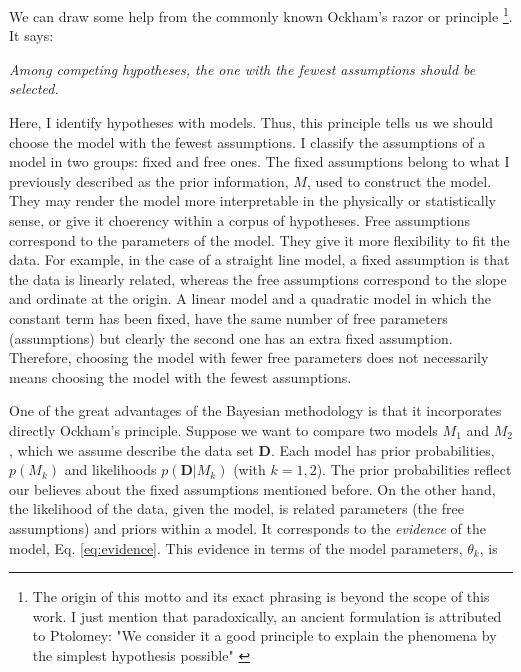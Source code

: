We can draw some help from the commonly known Ockham's razor or principle \footnote{The origin of this motto and its exact phrasing is beyond the scope of this work. I just mention that paradoxically, an ancient formulation is attributed to Ptolomey: "We consider it a good principle to explain the phenomena by the simplest hypothesis possible" \citep{Franklin2001}}. It says:

\textit{Among competing hypotheses, the one with the fewest assumptions should be selected.}

Here, I identify hypotheses with models. Thus, this principle tells us we should choose the model with the fewest assumptions. I classify the assumptions of a model in two groups: fixed and free ones. The fixed assumptions belong to what I previously described as the prior information, $M$, used to construct the model. They may render the model more interpretable  in the physically or statistically sense,  or give it choerency within a corpus of hypotheses. Free assumptions correspond to the parameters of the model. They give it more flexibility to fit the data. For example, in the case of a straight line model, a fixed assumption is that the data is linearly related, whereas the free assumptions correspond to the slope and ordinate at the origin. A linear model and a quadratic model in which the constant term has been fixed, have the same number of free parameters (assumptions) but clearly the second one has an extra fixed assumption. Therefore, choosing the model with fewer free parameters does not necessarily means choosing the model with the fewest assumptions.

One of the great advantages of the Bayesian methodology is that it incorporates directly Ockham's principle. Suppose we want to compare two models $M_1$ and $M_2$, which we assume describe the data set $\mathbf{D}$. Each model has prior probabilities, $p(M_k)$ and likelihoods $p(\mathbf{D}|M_k)$ (with $k=1,2$). The prior probabilities reflect our believes about the fixed assumptions mentioned before. On the other hand, the likelihood of the data, given the model, is related parameters (the free assumptions) and priors within a model. It corresponds to the \emph{evidence} of the model, Eq. \ref{eq:evidence}. This evidence in terms of the model parameters, $\theta_k$, is

